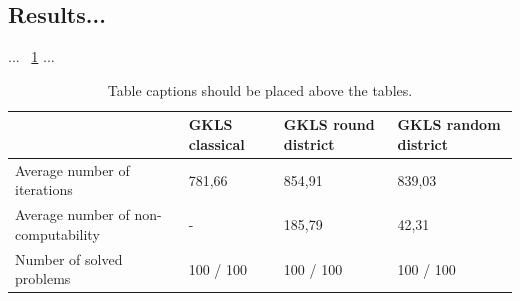 \documentclass[runningheads]{llncs}
\begin{document}
\subsection{Results... }
...  ~\ref{tab1} ...
\begin{table}
\caption{Table captions should be placed above the
tables.}\label{tab1}
\begin{tabular}{|l|l|l|l|}
\hline
 &  GKLS classical & GKLS round district & GKLS random district \\
\hline
Average number of iterations & 781,66	& 854,91 & 839,03 \\
Average number of non-computability & - & 185,79 & 42,31 \\
Number of solved problems & 100 / 100 & 100 / 100 & 100 / 100\\
\hline
\end{tabular}
\end{table}
\end{document}
